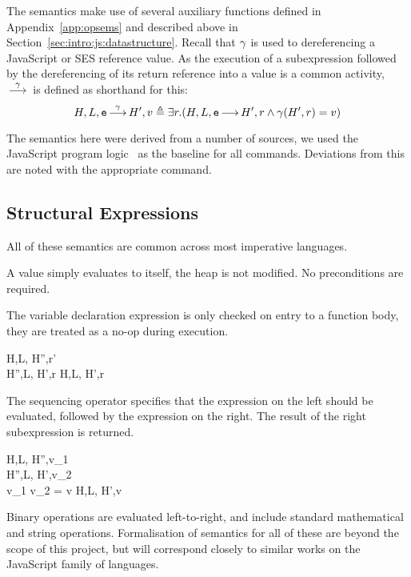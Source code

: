 \documentclass[a4paper,notitlepage]{report}
\begin{document}
  The semantics make use of several auxiliary functions defined in
  Appendix~\ref{app:opsems} and described above in
  Section~\ref{sec:intro:js:datastructure}. Recall that $\gamma$ is used to
  dereferencing a JavaScript or SES reference value.
  As the execution of a subexpression followed by the dereferencing of its
  return reference into a value is a
  common activity, $\overset{\gamma}{{\,\longrightarrow\,}}$ is defined as shorthand for this:
  \[ H,L,\mathtt{e} \overset{\gamma}{{\,\longrightarrow\,}} H',v \triangleq \exists r. (H,L,\mathtt{e} {\,\longrightarrow\,} H',r
  \wedge \gamma(H',r) = v) \]

  The semantics here were derived from a number of sources, we used the
  JavaScript program logic~\cite{gms-popl} as the baseline for all commands.
  Deviations from this are noted with the appropriate command.

  \subsection{Structural Expressions}
  \label{subsec:structuralexpressions}
  All of these semantics are common across most imperative languages.


  A value simply evaluates to itself, the heap is not modified. No preconditions
  are required.


  The variable declaration expression is only checked on entry to a function
  body, they are treated as a no-op during execution.

    {H,L, \evalsto H'',r' \\
     H'',L, \evalsto H',r}
   {H,L, \evalsto H',r}
  \nopagebreak

  The sequencing operator specifies that the expression on the left should be
  evaluated, followed by the expression on the right. The result of the right
  subexpression is returned.

    {H,L, \gevalsto H'',v_1 \\
     H'',L, \gevalsto H',v_2\\
     v_1 \oplus v_2 = v}
   {H,L, \evalsto H',v}

  Binary operations are evaluated left-to-right, and include standard
  mathematical and string operations. Formalisation of semantics for all of these
  are beyond the scope of this project, but will correspond closely to similar
  works on the JavaScript family of languages.
\end{document}
